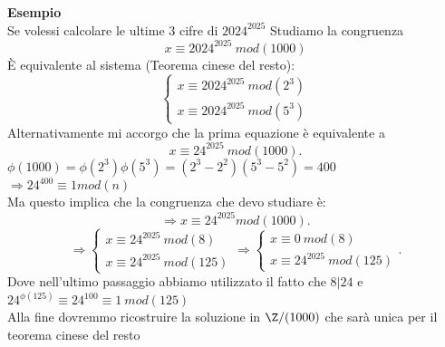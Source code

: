 \documentclass[12px]{article}
\begin{document}
	 \textbf{Esempio}\\
	 Se volessi calcolare le ultime $3$ cifre di $2024^{2025}$ Studiamo la congruenza  \[x\equiv 2024^{2025} \ mod(1000)\]
	 È equivalente al sistema (Teorema cinese del resto):\[
	 \begin{cases}
	 x\equiv 2024^{2025} \ mod(2^3)\\
	 x\equiv 2024^{2025} \ mod(5^3)
 \end{cases}\]
 Alternativamente mi accorgo che la prima equazione è equivalente a
 \[
	 x\equiv 24^{2025} \ mod(1000)
 .\] 
 $\phi(1000) = \phi(2^3)\phi(5^3) = (2^3 - 2^2)(5^3-5^2) = 400$\\
 $ \Rightarrow 24^{400} \equiv 1 mod(n)$\\
 Ma questo implica che la congruenza che devo studiare è:
 \[
 \Rightarrow x\equiv 24^{2025} mod(1000)
 .\] 
 \[
 \Rightarrow \begin{cases}
	 x\equiv 24^{2025}\ mod(8)\\
	 x\equiv 24^{2025}\ mod(125)
 \end{cases} \Rightarrow \begin{cases}
 	x\equiv 0\ mod(8)\\
	x\equiv 24^{2025} \ mod(125)
 \end{cases}
 .\] 
 Dove nell'ultimo passaggio abbiamo utilizzato il fatto che $8|24$ e $24^{\phi(125)}\equiv 24^{100}\equiv 1\ mod(125)$\\
 Alla fine dovremmo ricostruire la soluzione in $\Z/(1000)$ che sarà unica per il teorema cinese del resto
\end{document}
